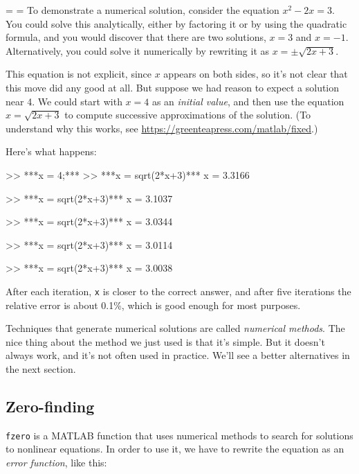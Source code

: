 
{\binoppenalty=\maxdimen%
\relpenalty=\maxdimen%
To demonstrate a numerical solution, consider the equation $x^2 - 2x = 3$.  You could solve this analytically, either by factoring it or by
using the quadratic formula, and you would discover that there are
two solutions, $x=3$ and $x=-1$.  Alternatively, you could solve it
numerically by rewriting it as $x = \pm \sqrt{2x+3}$.}

This equation is not explicit, since $x$ appears on both sides, so
it's not clear that this move did any good at all.  But suppose we had
reason to expect a solution near 4.
We could start with $x=4$ as an {\em initial value}, and then use
the equation $x = \sqrt{2x+3}$ to compute successive
approximations of the solution. (To understand why this
works, see \url{https://greenteapress.com/matlab/fixed}.)


Here's what happens:

\begin{code}
>> ***x = 4;***
>> ***x = sqrt(2*x+3)***
x = 3.3166

>> ***x = sqrt(2*x+3)***
x = 3.1037

>> ***x = sqrt(2*x+3)***
x = 3.0344

>> ***x = sqrt(2*x+3)***
x = 3.0114

>> ***x = sqrt(2*x+3)***
x = 3.0038
\end{code}

After each iteration, \lstinline{x} is closer to the correct answer,
and after five iterations the relative error is about 0.1\%, which
is good enough for most purposes.


Techniques that generate numerical solutions are called
\emph{numerical methods}.  
The nice thing about the method we just used is that it's simple.  But it doesn't always
work, and it's not often used in practice.
We'll see a better alternatives in the next section.

\subsection{Zero-finding}
\label{zero}


\lstinline{fzero} is a MATLAB function that uses numerical methods to search for solutions to nonlinear equations.  In order to use it, we have to rewrite the equation as an {\em error function}, like this:

